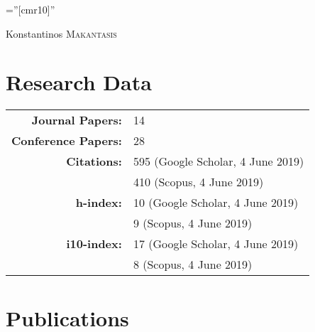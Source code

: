 \documentclass[a4paper,10pt]{article}
\begin{document}

\pagestyle{fancy} %

\font\fb=''[cmr10]'' %

\par{\centering
		{\Huge Konstantinos \textsc{Makantasis} \\ \vspace{0.1in} %
	}\bigskip\par}



\section{Research Data}
\begin{tabular}{rl}
	\textbf{Journal Papers:}& 14\\
	\textbf{Conference Papers:}& 28\\
	\textbf{Citations:}& 595 (Google Scholar, 4 June 2019)\\
	& 410 (Scopus, 4 June 2019)\\
	\textbf{h-index:}& 10 (Google Scholar, 4 June 2019)\\
	& 9 (Scopus, 4 June 2019)\\
	\textbf{i10-index:}& 17 (Google Scholar, 4 June 2019)\\
	& 8 (Scopus, 4 June 2019)\\
\end{tabular}


\vspace{0.2in}
\section{Publications}
\end{document}
